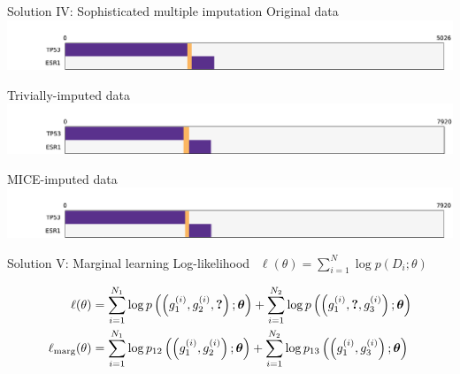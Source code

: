 \documentclass[mathserif]{beamer}
\begin{document}
\begin{frame}{Solution IV: Sophisticated multiple imputation}
  \centering
  Original data
  \includegraphics[width=\textwidth,trim={2cm 0 0 1cm},clip]{figures/group_orig_stretched.pdf}

  \vspace{2em}
  Trivially-imputed data
  \includegraphics[width=\textwidth,trim={2cm 0 0 1cm},clip]{figures/group_filled.pdf}
  
  \vspace{2em}
  MICE-imputed data
  \includegraphics[width=\textwidth,trim={2cm 0 0 1cm},clip]{figures/group_mice.pdf}
\end{frame}

\begin{frame}{Solution V: Marginal learning}
Log-likelihood $\ \ \ell(\theta) = \displaystyle\sum_{i=1}^{N} \log p(D_i; \theta)$
  
\begin{align*}
  \ell(\theta) &= \sum_{i=1}^{N_1} \log p\left(\left(g_1^{(i)}, g_2^{(i)}, \bm{?}\right); \bm{\theta}\right) + \sum_{i=1}^{N_2} \log p\left(\left(g_1^{(i)}, \bm{?}, g_3^{(i)}\right); \bm{\theta}\right)\\
  \ell_{\textrm{marg}}(\theta) &= \sum_{i=1}^{N_1} \log p_{12}\left(\left(g_1^{(i)}, g_2^{(i)}\right); \bm{\theta}\right) + \sum_{i=1}^{N_2} \log p_{13}\left(\left(g_1^{(i)}, g_3^{(i)}\right); \bm{\theta}\right)
\end{align*}

\vspace{1em}
\end{frame}
\end{document}
